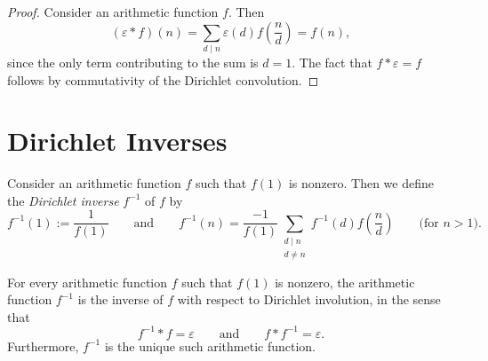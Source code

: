 \begin{proof}
  Consider an arithmetic function $f$. Then
  \begin{equation*}
    (\varepsilon\ast f)(n)=\sum_{d\mid n}\varepsilon(d)f\left(\frac{n}{d}\right)=f(n),
  \end{equation*}
  since the only term contributing to the sum is $d=1$. The fact that $f\ast\varepsilon=f$ follows by commutativity of the Dirichlet convolution.
\end{proof}

\section{Dirichlet Inverses}

\begin{definition}
  Consider an arithmetic function $f$ such that $f(1)$ is nonzero. Then we define the \emph{Dirichlet inverse} $f^{-1}$ of $f$ by
  \begin{equation*}
    f^{-1}(1) := \frac{1}{f(1)}\qquad\text{and}\qquad f^{-1}(n)=\frac{-1}{f(1)}\sum_{\substack{d\mid n \\ d\neq n}}f^{-1}(d)f\left(\frac{n}{d}\right)\qquad \text{(for $n>1$)}.
  \end{equation*}
\end{definition}

\begin{theorem}
  For every arithmetic function $f$ such that $f(1)$ is nonzero, the arithmetic function $f^{-1}$ is the inverse of $f$ with respect to Dirichlet involution, in the sense that
  \begin{equation*}
    f^{-1}\ast f=\varepsilon\qquad\text{and}\qquad f\ast f^{-1}=\varepsilon.
  \end{equation*}
  Furthermore, $f^{-1}$ is the unique such arithmetic function.
\end{theorem}

